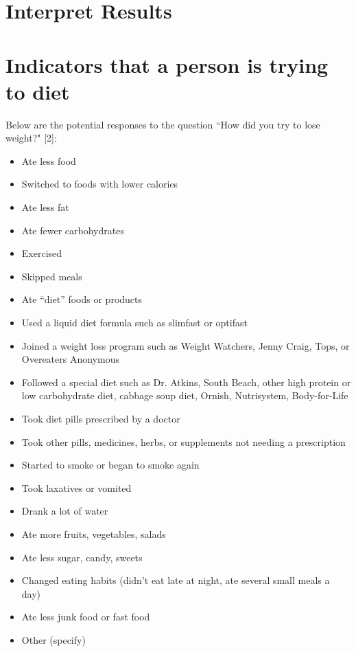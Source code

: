 \documentclass{article}
\begin{document}

\section{Interpret Results}





\section{Indicators that a person is trying to diet}

Below are the potential responses to the question ``How did you try to lose weight?" [2]:

\begin{itemize}[noitemsep]
\item Ate less food
\item Switched to foods with lower calories
\item Ate less fat
\item Ate fewer carbohydrates
\item Exercised
\item Skipped meals
\item Ate ``diet'' foods or products
\item Used a liquid diet formula such as slimfast or optifast
\item Joined a weight loss program such as Weight Watchers, Jenny Craig, Tops, or Overeaters Anonymous
\item Followed a special diet such as Dr. Atkins, South Beach, other high protein or low carbohydrate diet, cabbage soup diet, Ornish, Nutrisystem, Body-for-Life
\item Took diet pills prescribed by a doctor
\item Took other pills, medicines, herbs, or supplements not needing a prescription
\item Started to smoke or began to smoke again
\item Took laxatives or vomited
\item Drank a lot of water
\item Ate more fruits, vegetables, salads
\item Ate less sugar, candy, sweets
\item Changed eating habits (didn't eat late at night, ate several small meals a day)
\item Ate less junk food or fast food
\item Other (specify)
\end{itemize}


{}

\end{document}
